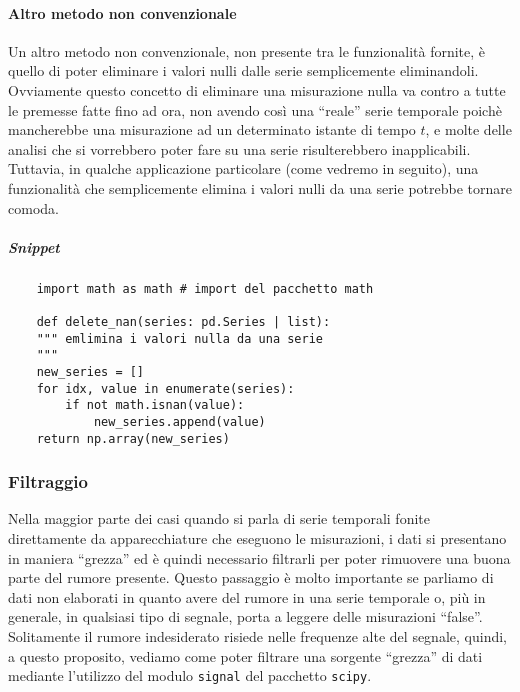\paragraph{Altro metodo non convenzionale}
Un altro metodo non convenzionale, non presente tra le funzionalità fornite,
è quello di poter eliminare i valori nulli dalle serie semplicemente
eliminandoli. Ovviamente questo concetto di eliminare una misurazione nulla va
contro a tutte le premesse fatte fino ad ora, non avendo così una ``reale''
serie temporale poichè mancherebbe una misurazione ad un determinato istante di tempo
$t$, e molte delle analisi che si vorrebbero poter fare su una serie risulterebbero
inapplicabili. 
Tuttavia, in qualche applicazione particolare (come vedremo in seguito), una funzionalità
che semplicemente elimina i valori nulli da una serie potrebbe tornare comoda.
\subparagraph*{Snippet}
\begin{verbatim}
    import math as math # import del pacchetto math

    def delete_nan(series: pd.Series | list):
    """ emlimina i valori nulla da una serie
    """
    new_series = []
    for idx, value in enumerate(series):
        if not math.isnan(value):
            new_series.append(value)
    return np.array(new_series)
\end{verbatim}


\subsubsection{Filtraggio}
Nella maggior parte dei casi quando si parla di serie temporali fonite direttamente 
da apparecchiature che eseguono le misurazioni, i dati si presentano in maniera
``grezza'' ed è quindi necessario filtrarli per poter rimuovere una buona parte
del rumore presente. Questo passaggio è molto importante se parliamo di dati non elaborati
in quanto avere del rumore in una serie temporale o, più in generale, in qualsiasi
tipo di segnale, porta a leggere delle misurazioni ``false''. Solitamente il rumore
indesiderato risiede nelle frequenze alte del segnale, quindi, a questo proposito,
vediamo come poter filtrare una sorgente ``grezza'' di dati mediante l'utilizzo del
modulo \texttt{signal} del pacchetto \texttt{scipy}.
